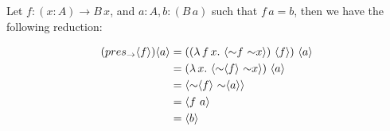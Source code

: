 \begin{example}
    Let $f: (x: A) \to B\,x$, and $a: A, b: (B\,a)$ such that $f\,a = b$, then we have the following reduction:

    \begin{align*}
        (pres_\to \langle f\rangle) \langle a\rangle 
        &= ((\lambda\,f\,x.\,\,\langle {\sim} f \,\, {\sim} x\rangle) \,\, \langle f\rangle) \,\, \langle a\rangle \\
        &= (\lambda\,x.\,\,\langle {\sim} \langle f\rangle \,\, {\sim} x\rangle) \,\, \langle a\rangle \\
        &= \langle {\sim} \langle f\rangle \,\, {\sim} \langle a\rangle\rangle \\
        &= \langle f \,\, a\rangle \\
        &= \langle b\rangle
    \end{align*}
\end{example}






    
